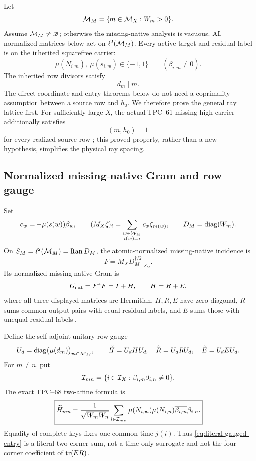 Let
\[
 \mathcal M_M=\{m\in\mathcal M_X:W_m>0\}.
\]
Assume \(\mathcal M_M\ne\varnothing\); otherwise the missing-native analysis is
vacuous.
All normalized matrices below act on
\(\ell^2(\mathcal M_M)\).  Every active target and residual label is on the
inherited squarefree carrier:
\begin{equation}
 \mu(N_{i,m}),\ \mu(s_{i,m})\in\{-1,1\}
 \qquad(\beta_{i,m}\ne0).
 \label{eq:squarefree-key-carrier}
\end{equation}
The inherited row divisors satisfy
\begin{equation}
 d_m\mid m.
 \label{eq:row-divisor-condition}
\end{equation}
The direct coordinate and entry theorems below do not need a coprimality
assumption between a source row and \(h_0\).  We therefore prove the
general ray lattice first.  For sufficiently large \(X\), the actual
TPC--61 missing-high carrier additionally satisfies
\begin{equation}
 (m,h_0)=1
 \label{eq:physical-row-primitivity}
\end{equation}
for every realized source row \citep{WangTPC61}; this proved property,
rather than a new hypothesis, simplifies the physical ray spacing.

\subsection{Normalized missing-native Gram and row gauge}

Set
\[
 c_w=-\mu(s(w))\beta_w,\qquad
 (M_X\zeta)_i
 =\sum_{\substack{w\in\mathcal W_M\\i(w)=i}}
 c_w\zeta_{m(w)},
 \qquad
 D_M=\operatorname{diag}(W_m).
\]
On \(S_M=\ell^2(\mathcal M_M)=\operatorname{Ran} D_M\), the atomic-normalized
missing-native incidence is
\[
 F=M_XD_M^{\dagger/2}\big|_{S_M}.
\]
Its normalized missing-native Gram is
\[
 G_{\rm nat}=F^*F=I+H,\qquad H=R+E,
\]
where all three displayed matrices are Hermitian, \(H,R,E\) have zero
diagonal, \(R\) sums common-output pairs with equal residual labels, and
\(E\) sums those with unequal residual labels
\citep{WangTPC68}.

Define the self-adjoint unitary row gauge
\begin{equation}
 U_d=\operatorname{diag}\bigl(\mu(d_m)\bigr)_{m\in\mathcal M_M},
 \qquad
 \widetilde H=U_dHU_d,
 \quad
 \widetilde R=U_dRU_d,
 \quad
 \widetilde E=U_dEU_d.
 \label{eq:row-gauge}
\end{equation}
For \(m\ne n\), put
\[
 \mathcal I_{mn}=\{i\in\mathcal I_X:\beta_{i,m}\beta_{i,n}\ne0\}.
\]
The exact TPC--68 two-affine formula is
\begin{equation}
 \boxed{
 \widetilde H_{mn}
 =
 \frac1{\sqrt{W_mW_n}}
 \sum_{i\in\mathcal I_{mn}}
 \mu(N_{i,m})\mu(N_{i,n})
 \overline{\beta_{i,m}}\beta_{i,n}.}
 \label{eq:literal-gauged-entry}
\end{equation}
Equality of complete keys fixes one common time \(j(i)\).  Thus
\eqref{eq:literal-gauged-entry} is a literal two-corner sum, not a
time-only surrogate and not the four-corner coefficient of
\(\operatorname{tr}(ER)\).

